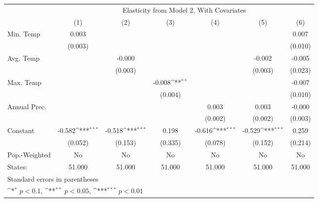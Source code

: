 {
\def\sym#1{\ifmmode^{#1}\else\(^{#1}\)\fi}
\begin{tabular}{l*{6}{c}}
\hline\hline
            &\multicolumn{6}{c}{Elasticity from Model 2, With Covariates}                                                                       \\
            &\multicolumn{1}{c}{(1)}         &\multicolumn{1}{c}{(2)}         &\multicolumn{1}{c}{(3)}         &\multicolumn{1}{c}{(4)}         &\multicolumn{1}{c}{(5)}         &\multicolumn{1}{c}{(6)}         \\
\hline
Min. Temp   &       0.003         &                     &                     &                     &                     &       0.007         \\
            &     (0.003)         &                     &                     &                     &                     &     (0.010)         \\
[1em]
Avg. Temp   &                     &      -0.000         &                     &                     &      -0.002         &      -0.005         \\
            &                     &     (0.003)         &                     &                     &     (0.003)         &     (0.023)         \\
[1em]
Max. Temp   &                     &                     &      -0.008\sym{**} &                     &                     &      -0.007         \\
            &                     &                     &     (0.004)         &                     &                     &     (0.010)         \\
[1em]
Annual Prec.&                     &                     &                     &       0.003         &       0.003         &      -0.000         \\
            &                     &                     &                     &     (0.002)         &     (0.002)         &     (0.003)         \\
[1em]
Constant    &      -0.582\sym{***}&      -0.518\sym{***}&       0.198         &      -0.616\sym{***}&      -0.529\sym{***}&       0.259         \\
            &     (0.052)         &     (0.153)         &     (0.335)         &     (0.078)         &     (0.152)         &     (0.214)         \\
\hline
Pop.-Weighted&          No         &          No         &          No         &          No         &          No         &          No         \\
States:     &      51.000         &      51.000         &      51.000         &      51.000         &      51.000         &      51.000         \\
\hline\hline
\multicolumn{7}{l}{\footnotesize Standard errors in parentheses}\\
\multicolumn{7}{l}{\footnotesize \sym{*} \(p<0.1\), \sym{**} \(p<0.05\), \sym{***} \(p<0.01\)}\\
\end{tabular}
}
